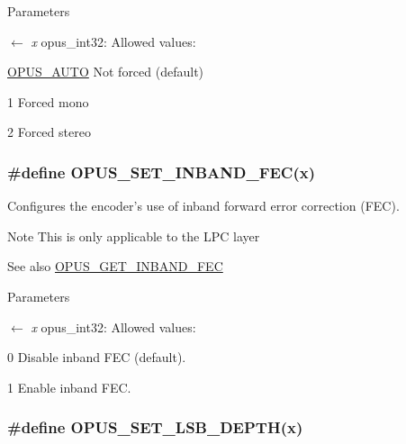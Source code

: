\begin{DoxyParams}{Parameters}
\item[\mbox{$\leftarrow$} {\em x}]{\ttfamily opus\_\-int32}: Allowed values: 
\begin{DoxyDescription}
\item[\hyperlink{group__opus__ctlvalues_ga1c5b3244b018ff4548d2d6bffa418472}{OPUS\_\-AUTO}]Not forced (default) 
\item[1 ]Forced mono 
\item[2 ]Forced stereo 
\end{DoxyDescription}\end{DoxyParams}
\hypertarget{group__opus__encoderctls_ga5b67dc832aa46c1c2f35752c46380545}{
\subsubsection[{OPUS\_\-SET\_\-INBAND\_\-FEC}]{\setlength{\rightskip}{0pt plus 5cm}\#define OPUS\_\-SET\_\-INBAND\_\-FEC(x)}}
\label{group__opus__encoderctls_ga5b67dc832aa46c1c2f35752c46380545}


Configures the encoder's use of inband forward error correction (FEC). \begin{DoxyNote}{Note}
This is only applicable to the LPC layer 
\end{DoxyNote}
\begin{DoxySeeAlso}{See also}
\hyperlink{group__opus__encoderctls_gaf792b27a6277ddf786413dbf472d0ac8}{OPUS\_\-GET\_\-INBAND\_\-FEC} 
\end{DoxySeeAlso}

\begin{DoxyParams}{Parameters}
\item[\mbox{$\leftarrow$} {\em x}]{\ttfamily opus\_\-int32}: Allowed values: 
\begin{DoxyDescription}
\item[0]Disable inband FEC (default). 
\item[1]Enable inband FEC. 
\end{DoxyDescription}\end{DoxyParams}
\hypertarget{group__opus__encoderctls_gaa23940eb477ff617edc14b8d66e104c0}{
\subsubsection[{OPUS\_\-SET\_\-LSB\_\-DEPTH}]{\setlength{\rightskip}{0pt plus 5cm}\#define OPUS\_\-SET\_\-LSB\_\-DEPTH(x)}}
\label{group__opus__encoderctls_gaa23940eb477ff617edc14b8d66e104c0}


